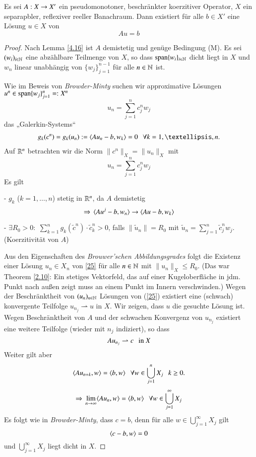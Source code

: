 \begin{theorem}[Brezis]\label{4.16}
    Es sei $A:X\rightarrow X'$ ein pseudomonotoner, beschränkter koerzitiver Operator,
    $X$ ein separapbler, reflexiver reeller Banachraum. Dann existiert für alle $b\in X'$
    eine Lösung $u\in X$ von
    \[
        Au=b
    \]
\end{theorem}

\begin{proof}
    Nach Lemma \ref{4.16} ist $A$ demistetig und genüge Bedingung (M). Es sei $(w_i)_{i\in \mathbb{N}}$
    eine abzählbare Teilmenge von $X$, so dass $\mathrm{span}\{w_i\}_{i\in \mathbb{N}}$ dicht liegt in $X$ und
    $w_n$ linear unabhängig von $\{w_j\}_{j=1}^{n-1}$ für alle $n\in\mathbb{N}$ ist.

    Wie im Beweis von \textit{Browder-Minty} suchen wir approximative Lösungen $u^n\in \mathrm{span}\{w_j\}
    _{j=1}^n=:X^n$
    \[
        u_n=\sum_{j=1}^n c_j^nw_j
    \]
    das „Galerkin-Systems“
    \begin{align}\label{25}
        g_k(c^n)=g_k(u_n):=\lal Au_n - b, w_k\ral =0\qq \forall k=1,…,n.
    \end{align}
    Auf $\mathbb{R}^n$ betrachten wir die Norm $\|c^n\|_X=\|u_n\|_X$ mit
    \[
        u_n=\sum_{j=1}^nc_j^nw_j
    \]
    Es gilt
    \begin{description}
    \item{-} $g_k$ ($k=1,…,n$) stetig in $\mathbb{R}^n$, da $A$ demistetig
    \[
        \Rightarrow \, \langle Au^j-b,w_n\rangle\rightarrow \langle Au -b,w_k\rangle
    \]
    \item{-} $\exists R_0>0:$ $\sum_{k=1}^n g_k(\tilde c^n)\cdot \tilde c_k^n>0$,
    falls $\|\tilde u_n\|=R_0$ mit $\tilde u_n=\sum_{j=1}^n\tilde c_j^nw_j$. (Koerzitivität von $A$) 
    \end{description}
    Aus den Eigenschaften des \textit{Brouwer'schen Abbildungsgrades} folgt die Existenz einer Lösung
    $u_n\in X_n$ von \ref{25} für alle $n\in \mathbb{N}$ mit $\|u_n\|_X\leq R_0$.
    (Das war Theorem \ref{2.10}: Ein stetiges Vektorfeld, das auf einer Kugeloberfläche in jdm. Punkt
     nach außen zeigt muss an einem Punkt im Innern verschwinden.)
    Wegen der Beschränktheit von $(u_n)_{n\in\mathbb{N}}$ Lösungen von (\ref{25}) existiert eine (schwach)
    konvergente Teilfolge $u_{n_j}\rightharpoonup u$ in $X$. Wir zeigen, dass $u$ die gesuchte Lösung
    ist. Wegen Beschränktheit von $A$ und der schwachen Konvergenz von $u_{n_j}$ existiert eine weitere
    Teilfolge (wieder mit $n_j$ indiziert), so dass
    \[
        Au_{n_j}\rightharpoonup c \hspace{.25cm} \text{in }X
    \]
    Weiter gilt aber
    \[
        \langle Au_{n+k}, w \rangle = \langle b,w \rangle \hspace{.25cm} \forall w\in \bigcup_{j=1}^n X_j \hspace{.25cm} k\geq 0.
    \]
    \begin{align*}
        \Rightarrow \, \lim_{n\rightarrow \infty} \langle Au_n, w\rangle = \langle b,w\rangle \hspace{.25cm} \forall w\in \bigcup_{j=1}^\infty
        X_j
    \end{align*}
    Es folgt wie in \textit{Browder-Minty}, dass $c=b$, denn für alle $w\in \bigcup_{j=1}^\infty X_j$
    gilt
    \[
        \langle c-b , w\rangle =0
    \]
    und $\bigcup_{j=1}^\infty X_j$ liegt dicht in $X$.


\end{proof}
